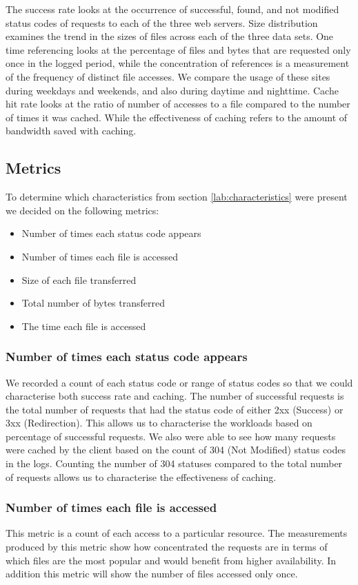 \documentclass[10pt,conference]{IEEEtran}
\begin{document}
The success rate looks at the occurrence of successful, found, and not modified status codes of requests to each of the three web servers. Size distribution examines the trend in the sizes of files across each of the three data sets. One time referencing looks at the percentage of files and bytes that are requested only once in the logged period, while the concentration of references is a measurement of the frequency of distinct file accesses. We compare the usage of these sites during weekdays and weekends, and also during daytime and nighttime.
Cache hit rate looks at the ratio of number of accesses to a file compared to the number of times it was cached. While the effectiveness of caching refers to the amount of bandwidth saved with caching.

\subsection{Metrics}
To determine which characteristics from section \ref{lab:characteristics} were present we decided on the following metrics:
\begin{itemize}[noitemsep]
    \item Number of times each status code appears
    \item Number of times each file is accessed
    \item Size of each file transferred
    \item Total number of bytes transferred
    \item The time each file is accessed
\end{itemize}

\subsubsection{Number of times each status code appears}
We recorded a count of each status code or range of status codes so that we could characterise both success rate and caching.
The number of successful requests is the total number of requests that had the status code of either 2xx (Success) or 3xx (Redirection). This allows us to characterise the workloads based on percentage of successful requests.
We also were able to see how many requests were cached by the client based on the count of 304 (Not Modified) status codes in the logs. Counting the number of 304 statuses compared to the total number of requests allows us to characterise the effectiveness of caching.

\subsubsection{Number of times each file is accessed}
This metric is a count of each access to a particular resource.
The measurements produced by this metric show how concentrated the requests are in terms of which files are the most popular and would benefit from higher availability. In addition this metric will show the number of files accessed only once.
\end{document}

